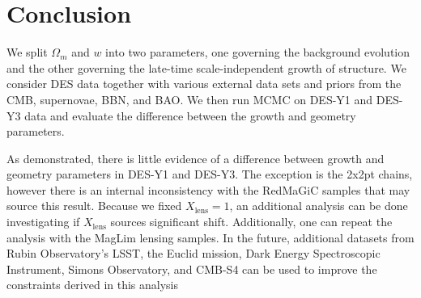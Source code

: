\section{Conclusion}
We split $\Omega_m$ and $w$ into two parameters, one governing the background evolution and the other governing the late-time scale-independent growth of structure. We consider DES data together with various external data sets and priors from the CMB, supernovae, BBN, and BAO. We then run MCMC on DES-Y1 and DES-Y3 data and evaluate the difference between the growth and geometry parameters. 

As demonstrated, there is little evidence of a difference between growth and geometry parameters in DES-Y1 and DES-Y3. The exception is the 2x2pt chains, however there is an internal inconsistency with the RedMaGiC samples that may source this result. Because we fixed $X_\mathrm{lens}=1$, an additional analysis can be done investigating if $X_{\mathrm{lens}}$ sources significant shift. Additionally, one can repeat the analysis with the MagLim lensing samples. In the future, additional datasets from Rubin Observatory's LSST, the Euclid mission, Dark Energy Spectroscopic Instrument, Simons Observatory, and CMB-S4 can be used to improve the constraints derived in this analysis
